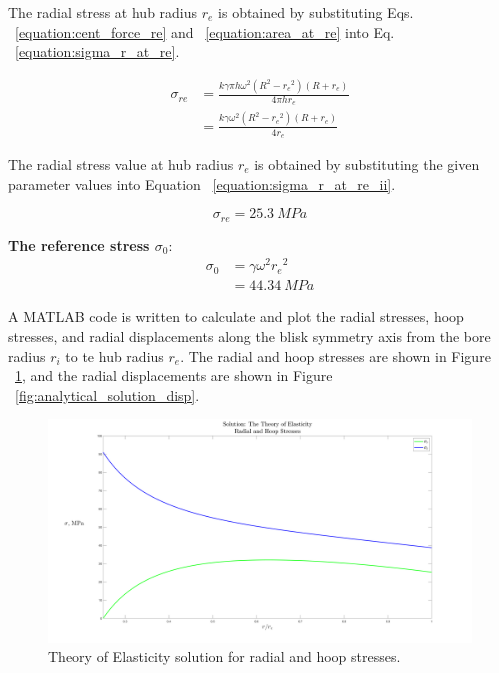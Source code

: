 \documentclass[12pt, a4paper, twoside]{article}
\begin{document}
The radial stress at hub radius $r_e$ is obtained by substituting Eqs. ~\ref{equation:cent_force_re} and ~\ref{equation:area_at_re} into Eq. ~\ref{equation:sigma_r_at_re}.

\begin{equation}
	\label{equation:sigma_r_at_re_ii}
	\begin{aligned}
		{\sigma}_{re} & =\frac{ k \gamma \pi h {\omega}^2 (R^2-{r_e}^2) (R + r_e) }{4 \pi h r_e}\\
		& =\frac{ k \gamma {\omega}^2 (R^2-{r_e}^2) (R + r_e) }{4 r_e}
	\end{aligned}
\end{equation}

The radial stress value at hub radius $r_e$ is obtained by substituting the given parameter values into Equation ~\ref{equation:sigma_r_at_re_ii}.

\begin{equation}
	\label{equation:sigma_r_val_at_re}
	{\sigma}_{re} = 25.3\:MPa
\end{equation}

\noindent
\textbf{The reference stress $\sigma_0$}:\\

\begin{equation}
	\label{equation:sigma_0_val_at_re}
	\begin{aligned}
		{\sigma}_{0} &= \gamma{\omega}^{2}{r_e}^{2}\\
		&= 44.34\:MPa
	\end{aligned}
\end{equation}

A MATLAB code is written to calculate and plot the radial stresses, hoop stresses, and radial displacements along the blisk symmetry axis from the bore radius $r_i$ to te hub radius $r_e$. The radial and hoop stresses are shown in Figure ~\ref{fig:analytical_solution_stress}, and the radial displacements are shown in Figure ~\ref{fig:analytical_solution_disp}.

\begin{figure}[h]
	\centering
	\includegraphics[scale=0.25]{analytical_solution_stress}
	\caption{Theory of Elasticity solution for radial and hoop stresses.}
	\label{fig:analytical_solution_stress}
\end{figure}
\end{document}
